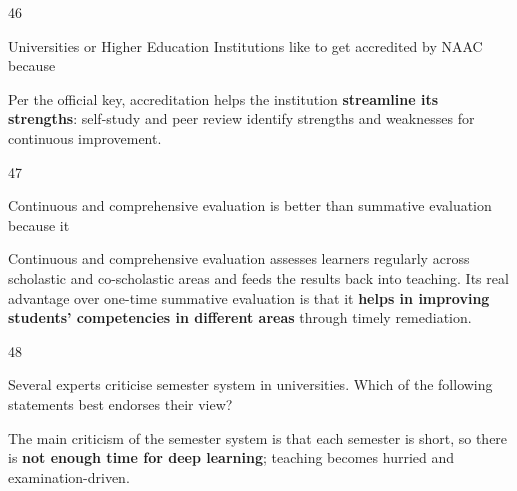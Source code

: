 \begin{question}{46}
{Universities or Higher Education Institutions like to get accredited by NAAC because\par}
\begin{explain}
Per the official key, accreditation helps the institution \textbf{streamline its strengths}: self-study and peer review identify strengths and weaknesses for continuous improvement.
\end{explain}
\end{question}

\begin{question}{47}
{Continuous and comprehensive evaluation is better than summative evaluation because it\par}
\begin{explain}
Continuous and comprehensive evaluation assesses learners regularly across scholastic and co-scholastic areas and feeds the results back into teaching. Its real advantage over one-time summative evaluation is that it \textbf{helps in improving students' competencies in different areas} through timely remediation.
\end{explain}
\end{question}

\begin{question}{48}
{Several experts criticise semester system in universities. Which of the following statements best endorses their view?\par}
\begin{explain}
The main criticism of the semester system is that each semester is short, so there is \textbf{not enough time for deep learning}; teaching becomes hurried and examination-driven.
\end{explain}
\end{question}

